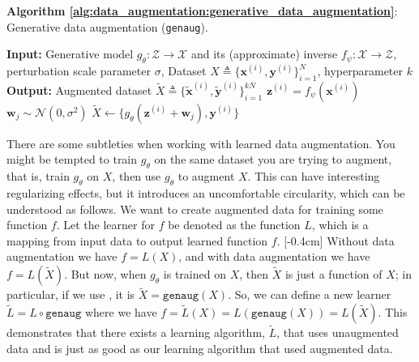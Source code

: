 \begin{algorithm}[h]
\SetAlgoVlined
\DontPrintSemicolon
\caption{{\bf Algorithm \ref{alg:data_augmentation:generative_data_augmentation}}: Generative data augmentation (\texttt{genaug}). }
\fakealgorithmcaption{}
\label{alg:data_augmentation:generative_data_augmentation}
{\bf Input:} Generative model $g_{\theta}: \mathcal{Z} \rightarrow \mathcal{X}$ and its (approximate) inverse $f_{\psi}: \mathcal{X} \rightarrow \mathcal{Z}$, perturbation scale parameter $\sigma$, Dataset $X \triangleq \{\mathbf{x}^{(i)},\mathbf{y}^{(i)}\}_{i=1}^N$, hyperparameter $k$\;
{\bf Output:} Augmented dataset $\tilde{X} \triangleq \{\tilde{\mathbf{x}}^{(i)}, \tilde{\mathbf{y}}^{(i)}\}_{i=1}^{kN}$\;
 {
     {
        $\mathbf{z}^{(i)} = f_{\psi}(\mathbf{x}^{(i)})$ \;
        $\mathbf{w}_j \sim \mathcal{N}(0,\sigma^2)$ \;
        $\tilde{X} \leftarrow \{g_{\theta}(\mathbf{z}^{(i)}+\mathbf{w}_j), \mathbf{y}^{(i)}\}$ \;
    }
}
\end{algorithm}



There are some subtleties when working with learned data augmentation. You might be tempted to train $g_{\theta}$ on the same dataset you are trying to augment, that is, train $g_{\theta}$ on $X$, then use $g_{\theta}$ to augment $X$. This can have interesting regularizing effects, but it introduces an uncomfortable circularity, which can be understood as follows. We want to create augmented data for training some function $f$. Let the learner for $f$ be denoted as the function $L$, which is a mapping from input data to output learned function $f$. [-0.4cm]
Without data augmentation we have $f = L(X)$, and with data augmentation we have $f = L(\tilde{X})$. But now, when $g_{\theta}$ is trained on $X$, then $\tilde{X}$ is just a function of $X$; in particular, if we use \algref{\ref{alg:data_augmentation:generative_data_augmentation}}, it is $\tilde{X} = \texttt{genaug}(X)$. So, we can define a new learner $\tilde{L} = L \circ \texttt{genaug}$ where we have $f = \tilde{L}(X) = L(\texttt{genaug}(X)) = L(\tilde{X})$. This demonstrates that there exists a learning algorithm, $\tilde{L}$, that uses unaugmented data and is just as good as our learning algorithm that used augmented data.

